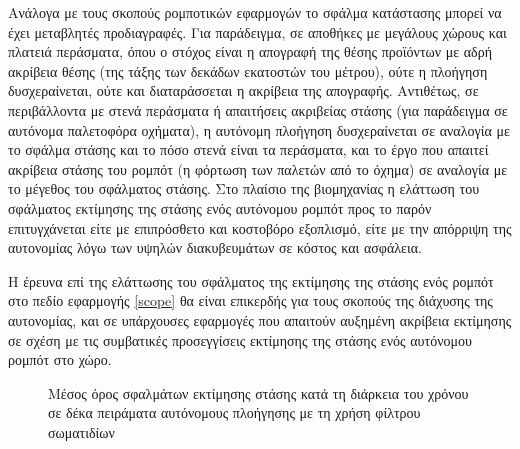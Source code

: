 Ανάλογα με τους σκοπούς ρομποτικών εφαρμογών το σφάλμα κατάστασης μπορεί να
έχει μεταβλητές προδιαγραφές. Για παράδειγμα, σε αποθήκες με μεγάλους χώρους και
πλατειά περάσματα, όπου ο στόχος είναι η απογραφή της θέσης προϊόντων με αδρή
ακρίβεια θέσης (της τάξης των δεκάδων εκατοστών του μέτρου), ούτε η πλοήγηση
δυσχεραίνεται, ούτε και διαταράσσεται η ακρίβεια της απογραφής. Αντιθέτως,
σε περιβάλλοντα με στενά περάσματα ή απαιτήσεις ακριβείας στάσης (για παράδειγμα
σε αυτόνομα παλετοφόρα οχήματα), η αυτόνομη πλοήγηση δυσχεραίνεται σε αναλογία
με το σφάλμα στάσης και το πόσο στενά είναι τα περάσματα, και το έργο που
απαιτεί ακρίβεια στάσης του ρομπότ (η φόρτωση των παλετών από το όχημα) σε
αναλογία με το μέγεθος του σφάλματος στάσης. Στο πλαίσιο της βιομηχανίας η
ελάττωση του σφάλματος εκτίμησης της στάσης ενός αυτόνομου ρομπότ προς το παρόν
επιτυγχάνεται είτε με επιπρόσθετο και κοστοβόρο εξοπλισμό, είτε με την απόρριψη
της αυτονομίας λόγω των υψηλών διακυβευμάτων σε κόστος και ασφάλεια.

Η έρευνα επί της ελάττωσης του σφάλματος της εκτίμησης της στάσης ενός ρομπότ
στο πεδίο εφαρμογής \ref{scope} θα είναι επικερδής για τους σκοπούς της
διάχυσης της αυτονομίας, και σε υπάρχουσες εφαρμογές που απαιτούν αυξημένη
ακρίβεια εκτίμησης σε σχέση με τις συμβατικές προσεγγίσεις εκτίμησης της στάσης
ενός αυτόνομου ρομπότ στο χώρο.

\begin{figure}[h]\centering\vspace{2cm}
   \begin{subfigure}{0.49\linewidth}\centering
     
   \end{subfigure}
   \begin{subfigure}{0.49\linewidth} \centering
     
   \end{subfigure}
   \vspace{0.75cm}
\caption{\small Μέσος όρος σφαλμάτων εκτίμησης στάσης κατά τη διάρκεια του
         χρόνου σε δέκα πειράματα αυτόνομους πλοήγησης με τη χρήση φίλτρου
         σωματιδίων}
\label{fig:02_01_05}
\end{figure}

